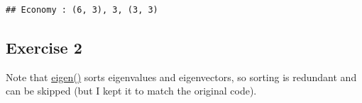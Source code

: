 \documentclass[
]{book}
\newenvironment{Shaded}{\begin{snugshade}}{\end{snugshade}}
\newcommand{\CharTok}[1]{\textcolor[rgb]{0.31,0.60,0.02}{#1}}
\newcommand{\KeywordTok}[1]{\textcolor[rgb]{0.13,0.29,0.53}{\textbf{#1}}}
\newcommand{\NormalTok}[1]{#1}
\newcommand{\OperatorTok}[1]{\textcolor[rgb]{0.81,0.36,0.00}{\textbf{#1}}}
\newcommand{\StringTok}[1]{\textcolor[rgb]{0.31,0.60,0.02}{#1}}
\begin{document}
\begin{Shaded}
\end{Shaded}

\begin{verbatim}
## Economy : (6, 3), 3, (3, 3)
\end{verbatim}

\hypertarget{exercise-2-11}{%
\subsection*{Exercise 2}\label{exercise-2-11}}

Note that \href{}{eigen()} sorts eigenvalues and eigenvectors, so sorting is redundant and can be skipped (but I kept it to match the original code).
\end{document}
